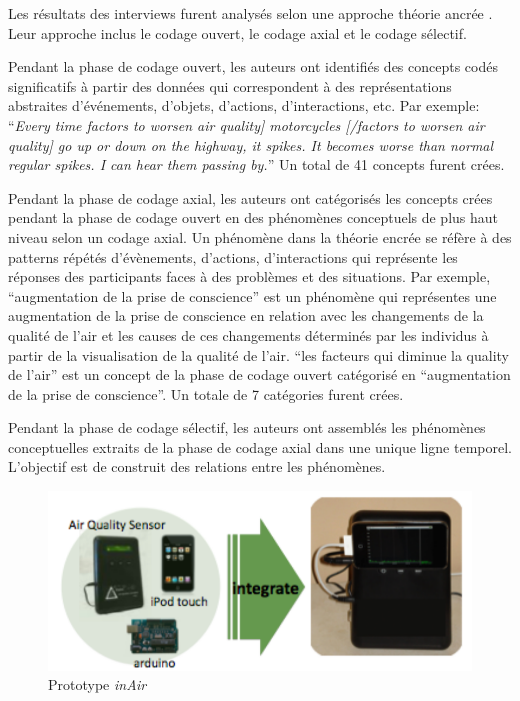 \documentclass[10pt,a5paper,twoside]{article}
\begin{document}
Les résultats des interviews furent analysés selon une approche théorie
ancrée \citep{strauss1990basics}. Leur approche inclus le codage ouvert,
le codage axial et le codage sélectif.

Pendant la phase de codage ouvert, les auteurs ont identifiés des
concepts codés significatifs à partir des données qui correspondent à
des représentations abstraites d'événements, d'objets, d'actions,
d'interactions, etc. Par exemple: ``\emph{Every time factors to worsen
air quality{]} motorcycles {[}/factors to worsen air quality{]} go up or
down on the highway, it spikes. It becomes worse than normal regular
spikes. I can hear them passing by.}'' Un total de 41 concepts furent
crées.

Pendant la phase de codage axial, les auteurs ont catégorisés les
concepts crées pendant la phase de codage ouvert en des phénomènes
conceptuels de plus haut niveau selon un codage axial. Un phénomène dans
la théorie encrée se réfère à des patterns répétés d'évènements,
d'actions, d'interactions qui représente les réponses des participants
faces à des problèmes et des situations. Par exemple, ``augmentation de
la prise de conscience'' est un phénomène qui représentes une
augmentation de la prise de conscience en relation avec les changements
de la qualité de l'air et les causes de ces changements déterminés par
les individus à partir de la visualisation de la qualité de l'air. ``les
facteurs qui diminue la quality de l'air'' est un concept de la phase de
codage ouvert catégorisé en ``augmentation de la prise de conscience''.
Un totale de 7 catégories furent crées.

Pendant la phase de codage sélectif, les auteurs ont assemblés les
phénomènes conceptuelles extraits de la phase de codage axial dans une
unique ligne temporel. L'objectif est de construit des relations entre
les phénomènes.

\begin{figure}
\centering
\includegraphics[width=0.900\hsize]{images/inair-screenshot3.png}
\caption{Prototype \emph{inAir}}\label{fig:inair1}
\end{figure}
\end{document}
